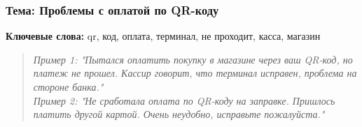 \documentclass{article}
\begin{document}
\subsubsection{Тема: Проблемы с оплатой по QR-коду}
\textbf{Ключевые слова:} qr, код, оплата, терминал, не проходит, касса, магазин
\begin{quote}
\small
\textit{Пример 1: "Пытался оплатить покупку в магазине через ваш QR-код, но платеж не прошел. Кассир говорит, что терминал исправен, проблема на стороне банка."} \\
\textit{Пример 2: "Не сработала оплата по QR-коду на заправке. Пришлось платить другой картой. Очень неудобно, исправьте пожалуйста."}
\end{quote}



\end{document}
